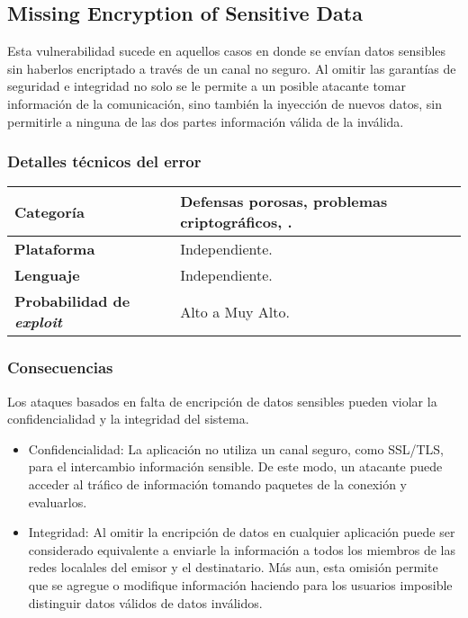 \subsection{Missing Encryption of Sensitive Data}
  
Esta vulnerabilidad sucede en aquellos casos en donde se envían datos sensibles sin haberlos encriptado a través de un canal no seguro.
Al omitir las garantías de seguridad e integridad no solo se le permite a un posible atacante tomar información de la comunicación, 
sino también la inyección de nuevos datos, sin permitirle a ninguna de las dos partes información válida de la inválida.

\subsubsection{Detalles técnicos del error}
\begin{tabular}[\baselineskip]{|l|p{11cm}|}
  \hline
  \textbf{Categoría} & Defensas porosas, problemas criptográficos, . \\
  \hline
  \textbf{Plataforma} & Independiente. \\
  \hline
  \textbf{Lenguaje} & Independiente. \\
  \hline
  \textbf{Probabilidad de \emph{exploit}} & Alto a Muy Alto. \\
  \hline
\end{tabular}

\subsubsection{Consecuencias}

Los ataques basados en falta de encripción de datos sensibles pueden violar la confidencialidad y la integridad del sistema.

\begin{itemize}
 \item Confidencialidad: La aplicación no utiliza un canal seguro, como SSL/TLS, para  el intercambio información sensible.
	De este modo, un atacante puede acceder al tráfico de información tomando paquetes de la conexión y evaluarlos.
 \item Integridad: Al omitir la encripción de datos en cualquier aplicación puede ser considerado equivalente a enviarle la información a todos los miembros de las redes localales del
	emisor y el destinatario. Más aun, esta omisión permite que se agregue o modifique información haciendo para los usuarios imposible distinguir datos válidos de datos inválidos.
\end{itemize}

